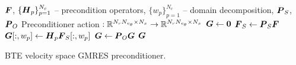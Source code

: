 \begin{algorithm}
	\begin{algorithmic}[1]
		\Require $\boldsymbol{F} $, $\{\boldsymbol{H}_p\}_{p=1}^{N_c}$ -- precondition operators, $\{w_p\}_{p=1}^{N_c}$ -- domain decomposition, $\boldsymbol{P}_S $, $\boldsymbol{P}_O$
		\Ensure Preconditioner action $: \mathbb{R}^{N_r N_{v_{\theta}} \times N_x} \rightarrow \mathbb{R}^{N_r N_{v_{\theta}} \times N_x}$
		\State $\boldsymbol{G} \leftarrow \boldsymbol{0} $ 
		\State $\boldsymbol{F}_S \leftarrow \boldsymbol{P}_S \boldsymbol{F}$ 
			\State $\boldsymbol{G}[:, w_p] \leftarrow \boldsymbol{H}_p \boldsymbol{F}_S[:, w_p]$
		\EndFor
		\State $\boldsymbol{G} \leftarrow \boldsymbol{P}_O \boldsymbol{G}$
		\State \Return $\boldsymbol{G}$ 
	\end{algorithmic}
	\caption{BTE velocity space GMRES preconditioner. \label{alg:vspace_action_precon}}
\end{algorithm}


